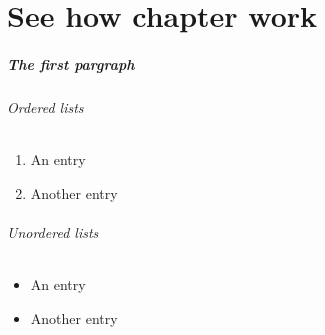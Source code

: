 \documentclass{report}
\begin{document}
\chapter{See how chapter work}
\paragraph{The first pargraph}
\subparagraph{Ordered lists}
\begin{enumerate}
    \item An entry
    \item Another entry
\end{enumerate}

\subparagraph{Unordered lists}
\begin{itemize}
    \item An entry
    \item Another entry
\end{itemize}
\end{document}
